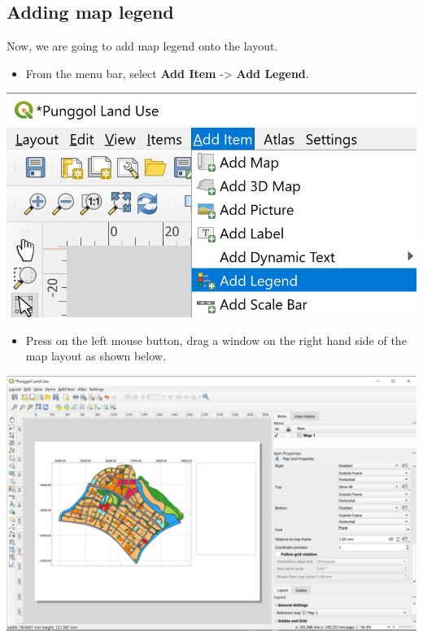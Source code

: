 \documentclass[
  letterpaper,
  DIV=11,
  numbers=noendperiod]{scrreprt}
\providecommand{\tightlist}{%
  \setlength{\itemsep}{0pt}\setlength{\parskip}{0pt}}\usepackage{longtable,booktabs,array}
\begin{document}
\hypertarget{adding-map-legend}{%
\subsection{Adding map legend}\label{adding-map-legend}}

Now, we are going to add map legend onto the layout.

\begin{itemize}
\tightlist
\item
  From the menu bar, select \textbf{Add Item} -\textgreater{}
  \textbf{Add Legend}.
\end{itemize}

\includegraphics{./img04/image62.jpg}

\begin{itemize}
\tightlist
\item
  Press on the left mouse button, drag a window on the right hand side
  of the map layout as shown below.
\end{itemize}

\includegraphics{./img04/image63.jpg}
\end{document}
